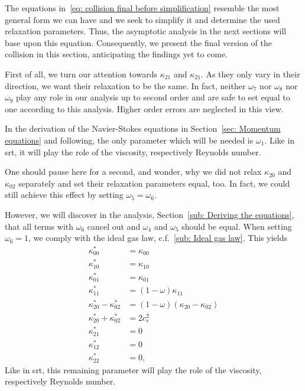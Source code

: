 The equations in~\eqref{eq: collision final before simplification} resemble the most general form we can have and we seek to simplify it and determine the used relaxation parameters.
Thus, the asymptotic analysis in the next sections will base upon this equation.
Consequently, we present the final version of the collision in this section, anticipating the findings yet to come.

First of all, we turn our attention towards $\kappa_{21}$ and $\kappa_{21}$.
As they only vary in their direction, we want their relaxation to be the same.
In fact, neither $\omega_7$ nor $\omega_8$ nor $\omega_9$ play any role in our analysis up to second order and are safe to set equal to one according to this analysis.
Higher order errors are neglected in this view.

In the derivation of the Navier-Stokes equations in Section~\ref{sec: Momentum equations} and following, the only parameter which will be needed is $\omega_1$.
Like in \gls{srt}, it will play the role of the viscosity, respectively Reynolds number.

One should pause here for a second, and wonder, why we did not relax $\kappa_{20}$ and $\kappa_{02}$ separately and set their relaxation parameters equal, too.
In fact, we could still achieve this effect by setting $\omega_5=\omega_6$.

However, we will discover in the analysis, Section~\ref{sub: Deriving the equations}, that all terms with $\omega_6$ cancel out and $\omega_4$ and $\omega_5$ should be equal.
When setting $\omega_6=1$, we comply with the ideal gas law, c.f.~\ref{sub: Ideal gas law}.
This yields
\begin{equation}
  \label{eq: collision equation system full}
  \begin{aligned}
    \kappa_{00}^{*} & = \kappa_{00} \\
    \kappa_{10}^{*} & = \kappa_{10} \\
    \kappa_{01}^{*} & = \kappa_{01} \\
    \kappa_{11}^{*} & = (1-\omega)\kappa_{11} \\
    \kappa_{20}^{*} - \kappa_{02}^{*}
      & = (1-\omega) (\kappa_{20} - \kappa_{02}) \\
    \kappa_{20}^{*} + \kappa_{02}^{*}
      & = 2 c_s^2 \\
    \kappa_{21}^{*} & = 0 \\
    \kappa_{12}^{*} & = 0 \\
    \kappa_{22}^{*} & = 0,
  \end{aligned}
\end{equation}
Like in \gls{srt}, this remaining parameter will play the role of the viscosity, respectively Reynolds number.

